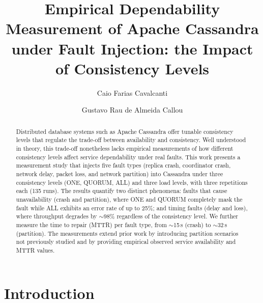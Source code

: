 \documentclass[runningheads]{llncs}
\begin{document}
\title{Empirical Dependability Measurement of Apache Cassandra under
Fault Injection: the Impact of Consistency Levels}

\author{Caio Farias Cavalcanti \and
Gustavo Rau de Almeida Callou}

\maketitle

\begin{abstract}
Distributed database systems such as Apache Cassandra offer tunable consistency
levels that regulate the trade-off between availability and consistency. Well
understood in theory, this trade-off nonetheless lacks empirical measurements of
how different consistency levels affect service dependability under real faults.
This work presents a measurement study that injects five fault types (replica
crash, coordinator crash, network delay, packet loss, and network partition)
into Cassandra under three consistency levels (ONE, QUORUM, ALL) and three load
levels, with three repetitions each (135 runs). The results quantify two
distinct phenomena: faults that cause unavailability (crash and partition), where
ONE and QUORUM completely mask the fault while ALL exhibits an error rate of up
to 25\%; and timing faults (delay and loss), where throughput degrades by
$\sim$98\% regardless of the consistency level. We further measure the time to
repair (MTTR) per fault type, from $\sim$15\,s (crash) to $\sim$32\,s
(partition). The measurements extend prior work by introducing partition
scenarios not previously studied and by providing empirical observed service
availability and MTTR values.

\end{abstract}

\section{Introduction}
\end{document}
